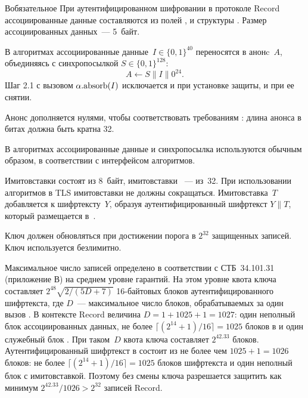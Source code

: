 \begin{appendix}{В}{обязательное}
При аутентифицированном шифровании в протоколе Record ассоциированные 
данные составляются из полей , 
 и  структуры 
. Размер ассоциированных данных~--- 5~байт.

В алгоритмах  ассоциированные данные~$I\in\{0,1\}^{40}$ 
переносятся в анонc~$A$, объединяясь с синхропосылкой $S\in\{0,1\}^{128}$:
$$
A\gets S\parallel I\parallel 0^{24}.
$$
Шаг 2.1 с вызовом $\alpha.\code{absorb}(I)$ исключается и при установке защиты, 
и при ее снятии.

\begin{note*}
Анонс дополняется нулями, чтобы соответствовать требованиям 
: длина анонса в битах должна быть кратна 32.
\end{note*}

В алгоритмах  ассоциированные данные и синхропосылка 
используются обычным образом, в соответствии с интерфейсом алгоритмов.

Имитовставки  состоят из 8~байт, имитовставки 
~--- из~32. При использовании алгоритмов в TLS
имитовставки не должны сокращаться. Имитовставка~$T$ добавляется к 
шифртексту~$Y$, образуя аутентифицированный шифртекст $Y\parallel T$,
который размещается в~.

Ключ  должен обновляться при достижении порога в $2^{32}$ 
защищенных записей. Ключ  используется безлимитно.

\begin{note*}
Максимальное число записей  определено в соответствии с 
СТБ~34.101.31 (приложение В) на среднем уровне гарантий. 
%
На этом уровне квота ключа составляет $2^{48}\sqrt{2/(5D+7)}$ 16-байтовых блоков
аутентифицированного шифртекста, где $D$~--- максимальное число блоков, 
обрабатываемых за один вызов . 
%
В контексте Record величина $D=1+1025+1=1027$: 
один неполный блок ассоциированных данных, не более 
$\lceil(2^{14}+1)/16\rceil=1025$ блоков в  и один 
служебный блок .
%
При таком~$D$ квота ключа составляет $2^{42.33}$ блоков.
%
Аутентифицированный шифртекст в 
состоит из не более чем $1025+1=1026$ блоков: не более 
$\lceil(2^{14}+1)/16\rceil=1025$ блоков шифртекста и один неполный блок с 
имитовставкой.
%
Поэтому без смены ключа разрешается защитить как минимум 
$2^{42.33}/1026>2^{32}$ записей Record.
\end{note*}


\end{appendix}
